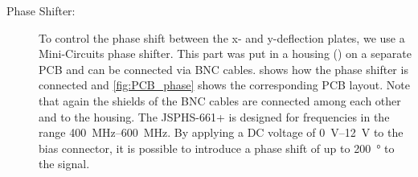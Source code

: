 \begin{description}
	\item[Phase Shifter:] To control the phase shift between the x- and y-deflection plates, we use a Mini-Circuits \cite{JSPHS-661} phase shifter. This part was put in a  housing (\cite{Hammond1455D601RD}) on a separate PCB and can be connected via BNC cables.  shows how the phase shifter is connected and \cref{fig:PCB_phase} shows the corresponding PCB layout. Note that again the shields of the BNC cables are connected among each other and to the housing. The JSPHS-661+ is designed for frequencies in the range \SIrange{400}{600}{\mega\hertz}. By applying a DC voltage of \SIrange{0}{12}{\volt} to the bias connector, it is possible to introduce a phase shift of up to \SI{200}{\degree} to the signal.
	
\end{description}

